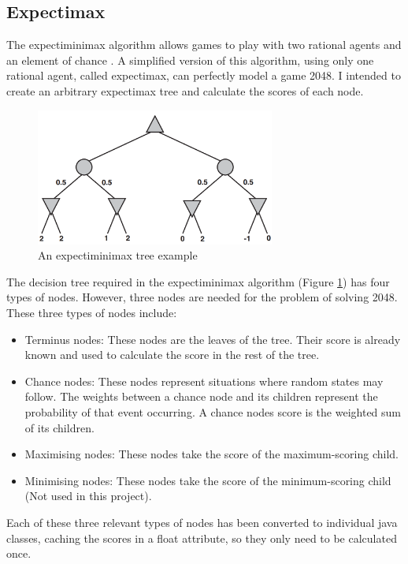 \documentclass{article}
\begin{document}
\subsection{Expectimax}
The expectiminimax algorithm allows games to play with two rational agents and an element of chance \cite[p.~200]{russell2010artificial}. A simplified version of this algorithm, using only one rational agent, called expectimax, can perfectly model a game 2048. I intended to create an arbitrary expectimax tree and calculate the scores of each node.
\label{subsec:expectimax}
\begin{figure}
    \centering
    \includegraphics[width=0.7\textwidth]{expectimax.png}
    \caption{An expectiminimax tree example \cite[p.~200]{russell2010artificial}}
    \label{fig:expectree}
\end{figure}
The decision tree required in the expectiminimax algorithm (Figure \ref{fig:expectree}) has four types of nodes. However, three nodes are needed for the problem of solving 2048. These three types of nodes include:
\begin{itemize}
    \item Terminus nodes: These nodes are the leaves of the tree. Their score is already known and used to calculate the score in the rest of the tree.
     \item Chance nodes: These nodes represent situations where random states may follow. The weights between
    a chance node and its children represent the probability of that event occurring. A chance node\textquotesingle s score is the weighted sum of its children.
    \item Maximising nodes: These nodes take the score of the maximum-scoring child.
    \item Minimising nodes: These nodes take the score of the minimum-scoring child (Not used in this project).
\end{itemize}
Each of these three relevant types of nodes has been converted to individual java classes, caching the scores in a float
attribute, so they only need to be calculated once.
\end{document}
